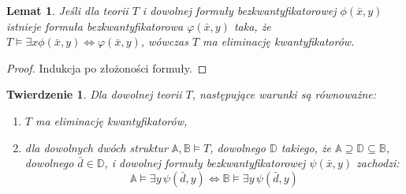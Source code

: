 \documentclass{article}
\newcommand{\A}{\mathbb{A}}
\newcommand{\B}{\mathbb{B}}
\newcommand{\D}{\mathbb{D}}
\theoremstyle{plain}
\newtheorem{tw}[thm]{Twierdzenie}
\newtheorem{lem}[thm]{Lemat}
\theoremstyle{definition}
\theoremstyle{remark}
\newcommand{\fae}{następujące warunki są równoważne: }
\begin{document}
\begin{lem}
	Jeśli dla teorii $T$ i dowolnej formuły bezkwantyfikatorowej
	$\phi(\bar{x}, y)$ istnieje formuła bezkwantyfikatorowa
	$\varphi(\bar{x}, y)$ taka, że
	$T \models \exists x \phi(\bar{x}, y) \iff \varphi(\bar{x}, y)$,
	wówczas $T$ ma eliminację kwantyfikatorów.
\end{lem}
\begin{proof}
	Indukcja po złożoności formuły.
\end{proof}

\begin{tw}
Dla dowolnej teorii $T$, \fae
	\begin{enumerate}
		\item $T$ ma eliminację kwantyfikatorów,
		\item dla dowolnych dwóch struktur $\A, \B \models T$,
			dowolnego $\D$ takiego, że $\A \supseteq \D \subseteq
			\B$, dowolnego $\bar{d} \in \D$, i dowolnej formuły
			bezkwantyfikatorowej $\psi(\bar{x}, y)$ zachodzi:
			\[\A \models \exists y \, \psi(\bar{d}, y) \iff \B
			\models \exists y \, \psi(\bar{d}, y)\]
	\end{enumerate}
\end{tw}
\end{document}
